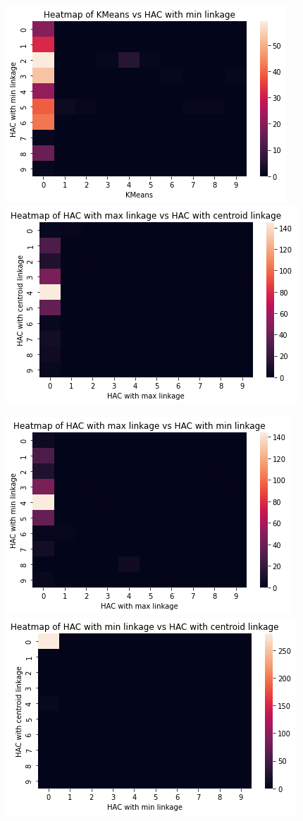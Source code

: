 \documentclass[submit]{harvardml}
\begin{document}
\includegraphics[scale=0.5]{plots/kmeans-hacmin.png} \
\includegraphics[scale=0.5]{plots/hacmax-haccentroid.png}

\includegraphics[scale=0.5]{plots/hacmax-hacmin.png} \
\includegraphics[scale=0.5]{plots/hacmin-haccentroid.png}
\end{document}
